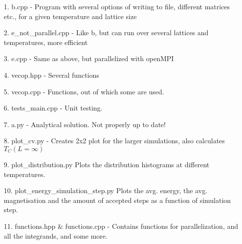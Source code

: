 \documentclass[10pt,a4paper]{article}
\begin{document}
\begin{itemize}
\item[1.] b.cpp - Program with several options of writing to file, different matrices etc., for a given temperature and lattice size
\item[2.] e\_not\_parallel.cpp - Like b, but can run over several lattices and temperatures, more efficient
\item[3.] e.cpp - Same as above, but parallelized with openMPI
\item[4.] vecop.hpp - Several functions
\item[5.] vecop.cpp - Functions, out of which some are used.
\item[6.] tests\_main.cpp - Unit testing.
\item[7.] a.py - Analytical solution. Not properly up to date!
\item[8.] plot\_cv.py - Creates 2x2 plot for the larger simulations, also calculates $T_C(L=\infty)$
\item[9.] plot\_distribution.py Plots the distribution histograms at different temperatures.
\item[10.] plot\_energy\_simulation\_step.py Plots the  avg. energy, the avg. magnetisation and the amount of accepted steps as a function of simulation step.
\item[11.] functions.hpp \& functions.cpp - Contains functions for parallelization, and all the integrands, and some more.
\end{itemize}
\cite{Lecture_Notes_Fall_2015}
\cite{Problem_set_3}








\begin{comment}

$$
\begin{bmatrix}
0 & 0 & 0 & 0 \\
0 & 0 & 0 & 0 \\
0 & 0 & 0 & 0 \\
0 & 0 & 0 & 0 \\
\end{bmatrix}
$$

\begin{lstlisting}[caption=insert caption]
for (unsigned int i = 0; i<100;i++{
}
\end{lstlisting}

\begin{figure}[h]
\texttt{[image: ]}
\caption{include caption}
\end{figure}

\end{comment}
\end{document}
